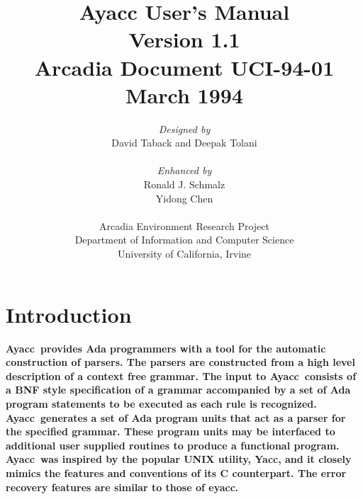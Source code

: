 \title{{\bf Ayacc User's Manual}\\
\medskip
Version 1.1\\
Arcadia Document UCI-94-01\\
March 1994}
\author{
{\it Designed by}\\
David Taback and Deepak Tolani\\
\medskip\\
{\it Enhanced by}\\
Ronald J. Schmalz\\
Yidong Chen\\
\medskip\\
Arcadia Environment Research Project\\
Department of Information and Computer Science\\
University of California, Irvine}
\date{}
\newcommand{\ayacc}{\bf Ayacc\rm\  }

   \addtolength{\oddsidemargin}{-0.5in} %
   \addtolength{\textwidth}{1.0in}
   \addtolength{\topmargin}{-0.5in}   
   \addtolength{\textheight}{1.25in}
   \renewcommand{\baselinestretch}{1.0} %
   \renewcommand{\topfraction}{0.95}
   \renewcommand{\textfraction}{0.05}  %


\begin{titlepage}
\maketitle
\end{titlepage}
\tableofcontents
\newpage
\listoffigures
\newpage
\section{Introduction}
\ayacc provides Ada programmers with a tool for the
automatic construction of parsers.  The parsers are constructed
from a high level description
of a context free grammar.  The input to \ayacc consists of a
BNF style specification of a grammar accompanied by a set of
Ada program statements to be executed as each rule is
recognized.  \ayacc generates a set of Ada program units that act as
a parser for the specified grammar.  These program units
may be interfaced to additional user supplied routines to produce a
functional program.  \ayacc was inspired by the popular UNIX
utility, {\bf Yacc}, and it closely mimics the features and conventions
of its C counterpart.  The error recovery features are similar to
those of eyacc.
